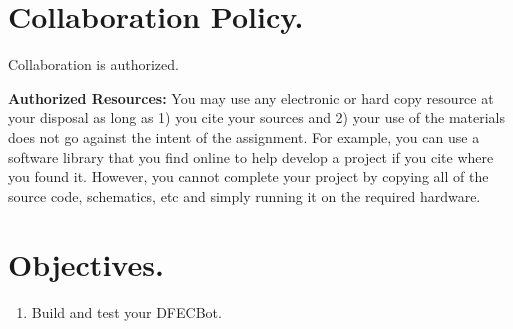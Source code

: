 \documentclass{handout}
\begin{document}
	\maketitle
	
	\section{Collaboration Policy.}
	Collaboration is authorized.
	
	\textbf{Authorized Resources:} You may use any electronic or hard copy resource at your disposal as long as 1) you cite your sources and 2) your use of the materials does not go against the intent of the assignment. For example, you can use a software library that you find online to help develop a project if you cite where you found it. However, you cannot complete your project by copying all of the source code, schematics, etc and simply running it on the required hardware.
	
	\section{Objectives.} 
	\begin{enumerate}
		\item Build and test your DFECBot.
	\end{enumerate}
	
\end{document}
